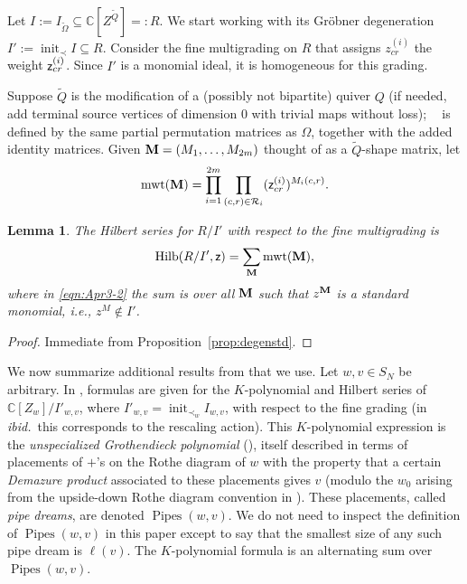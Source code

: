 \documentclass[12pt]{amsart}
\DeclareMathOperator{\tOmega}{\widetilde{\Omega}}
\newtheorem{lemma}[theorem]{Lemma}
\theoremstyle{definition}
\theoremstyle{remark}
\begin{document}
Let $I:=I_{\widetilde \Omega}\subseteq {\mathbb C}[Z^{\widetilde Q}]=:R$. We start working with its Gr\"obner degeneration 
$I':=\operatorname{init}_{\prec} I\subseteq R$. Consider the fine multigrading on $R$ that assigns
$z_{cr}^{(i)}$ the weight ${\sf z}_{cr}^{(i)}$. 
Since $I'$ is a monomial ideal, it is homogeneous for this grading.

Suppose ${\widetilde Q}$ is the modification of a  (possibly not bipartite) quiver $Q$ (if needed, add terminal source vertices of dimension $0$ with trivial maps without loss); $\tOmega$ is defined by the same partial permutation matrices as $\Omega$, together with the added identity matrices. 
Given ${\bf M}=(M_1,\ldots,M_{2m})$ thought of as a ${\widetilde Q}$-shape matrix, let
\[\operatorname{mwt}({\bf M})=\prod_{i=1}^{2m}\prod_{(c,r)\in {\mathcal R}_i}({\sf z}_{cr}^{(i)})^{M_i(c,r)}.\]

\begin{lemma}\label{prop:Jun18aaa}
The Hilbert series for $R/I'$ with respect to the fine multigrading is
\begin{equation}\label{eqn:Apr3-2}
\operatorname{Hilb}(R/I',{\sf z}) =\sum_{{\bf M}} \operatorname{mwt}({\bf M}), 
\end{equation}
where in \eqref{eqn:Apr3-2} the sum is over all ${\bf M}$ such that $z^{\bf M}$ is
a standard monomial, i.e., $z^M\not\in I'$.
\end{lemma}
\begin{proof}
Immediate from Proposition~\ref{prop:degenstd}.
\end{proof}

We now summarize additional results from \cite{WooYong} that we use.
Let $w,v\in S_N$ be arbitrary. In \cite[\S~4]{WooYong}, formulas are given for the $K$-polynomial and Hilbert series of ${\mathbb C}[Z_w]/I'_{w,v}$, where $I'_{w,v}=\operatorname{init}_{\prec_w}I_{w,v}$, with respect to the fine grading (in 
\emph{ibid.}~this corresponds to the rescaling action). This $K$-polynomial expression is the \emph{unspecialized Grothendieck polynomial} (\!\!\cite[Proposition~4.1]{WooYong}), itself described in terms of placements of $+$'s on the Rothe diagram of $w$ with the property that a certain \emph{Demazure product} associated to these placements gives
$v$ (modulo the $w_0$ arising from the upside-down
Rothe diagram convention in \cite{WooYong}). These placements, called
\emph{pipe dreams}, are denoted $\operatorname{Pipes}(w,v)$. We do not need to inspect
the definition of $\operatorname{Pipes}(w,v)$ in this paper except to say that the smallest size of any such pipe dream is $\ell(v)$. 
The $K$-polynomial formula is an alternating sum over $\operatorname{Pipes}(w,v)$.
\end{document}
